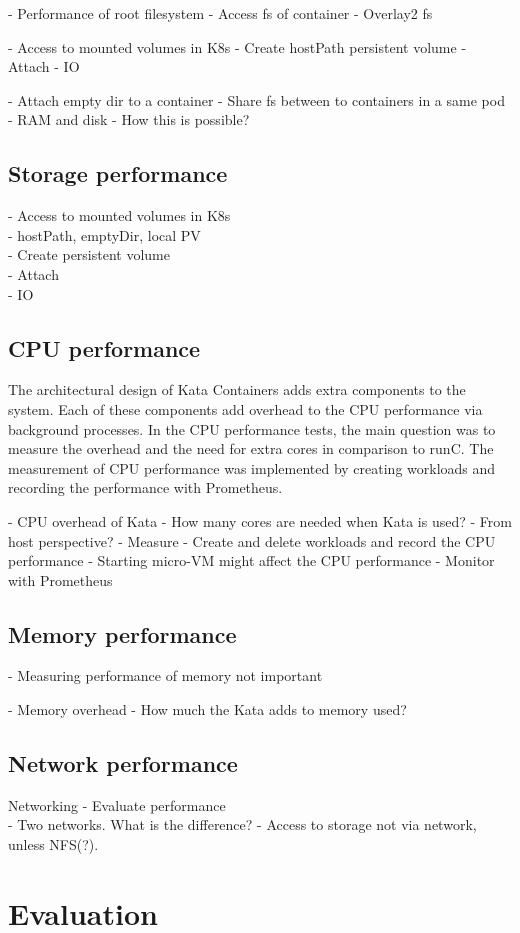 - Performance of root filesystem
	- Access fs of container
	- Overlay2 fs

- Access to mounted volumes in K8s
	- Create hostPath persistent volume
	- Attach
	- IO

- Attach empty dir to a container
	- Share fs between to containers in a same pod
	- RAM and disk
	- How this is possible?

\subsection{Storage performance}

- Access to mounted volumes in K8s \\
    - hostPath, emptyDir, local PV \\
	- Create persistent volume \\
	- Attach \\
	- IO

\subsection{CPU performance}

The architectural design of Kata Containers adds extra components to the system. Each of these components add overhead to the CPU performance via background processes. In the CPU performance tests, the main question was to measure the overhead and the need for extra cores in comparison to runC. The measurement of CPU performance was implemented by creating workloads and recording the performance with Prometheus. 

- CPU overhead of Kata
	- How many cores are needed when Kata is used?
	- From host perspective?
	- Measure
		- Create and delete workloads and record the CPU performance
			- Starting micro-VM might affect the CPU performance
			- Monitor with Prometheus

\subsection{Memory performance}

- Measuring performance of memory not important

- Memory overhead
	- How much the Kata adds to memory used?

\subsection{Network performance}

Networking
    - Evaluate performance \\
    - Two networks. What is the difference?
    - Access to storage not via network, unless NFS(?).

\section{Evaluation}